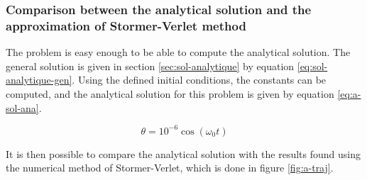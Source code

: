 \documentclass[a4paper,12pt,twoside]{article}
\begin{document}
\subsubsection{Comparison between the analytical solution and the approximation of Stormer-Verlet method}
The problem is easy enough to be able to compute the analytical solution.
The general solution is given in section \ref{sec:sol-analytique} by equation \ref{eq:sol-analytique-gen}.
Using the defined initial conditions, the constants can be computed, and the analytical solution for this problem is given by equation \ref{eq:a-sol-ana}.

\begin{equation}
	\theta = 10^{-6}\cos(\omega_0t)
	\label{eq:a-sol-ana}
\end{equation}

It is then possible to compare the analytical solution with the results found using the numerical method of Stormer-Verlet, which is done in figure \ref{fig:a-traj}.
\end{document}
